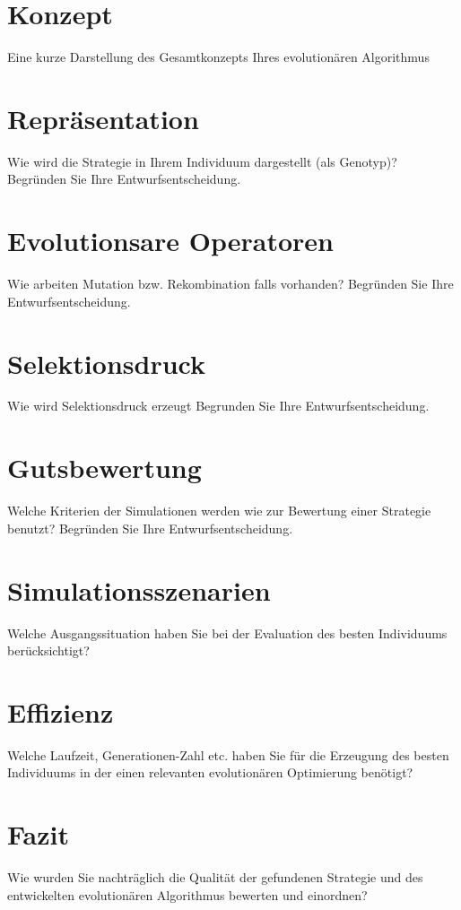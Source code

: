 \section{Konzept}
Eine kurze Darstellung des Gesamtkonzepts Ihres evolutionären Algorithmus 

\section{Repräsentation}
Wie wird die Strategie in Ihrem Individuum dargestellt (als Genotyp)? Begründen Sie Ihre Entwurfsentscheidung.

\section{Evolutionsare Operatoren}
Wie arbeiten Mutation bzw. Rekombination falls vorhanden? Begründen Sie Ihre Entwurfsentscheidung.

\section{Selektionsdruck}
Wie wird Selektionsdruck erzeugt Begrunden Sie Ihre Entwurfsentscheidung.

\section{Gutsbewertung}
Welche Kriterien der Simulationen werden wie zur Bewertung einer Strategie benutzt? Begründen Sie Ihre Entwurfsentscheidung.

\section{Simulationsszenarien}
Welche Ausgangssituation haben Sie bei der Evaluation des besten Individuums berücksichtigt?

\section{Effizienz}
Welche Laufzeit, Generationen-Zahl etc. haben Sie für die Erzeugung des besten Individuums in der einen relevanten evolutionären Optimierung benötigt?

\section{Fazit}
Wie wurden Sie nachträglich die Qualität der gefundenen Strategie und des entwickelten evolutionären Algorithmus bewerten und einordnen?